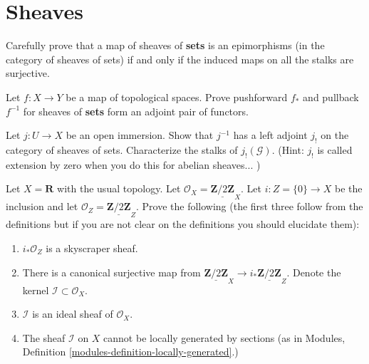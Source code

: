 \section{Sheaves}
\label{section-sheaves}

\begin{exercise}
\label{exercise-epi-sheaves-sets}
Carefully prove that a map of sheaves of {\bf sets}
is an epimorphisms (in the category of sheaves of sets) if and only if the
induced maps on all the stalks are surjective.
\end{exercise}

\begin{exercise}
\label{exercise-adjoint-push-pull}
Let $f : X \to Y$ be a map of topological spaces.
Prove pushforward $f_\ast$ and pullback $f^{-1}$ for sheaves of {\bf sets}
form an adjoint pair of functors.
\end{exercise}

\begin{exercise}
\label{exercise-j-shriek}
Let $j : U \to X$ be an open immersion. Show
that $j^{-1}$ has a left adjoint $j_{!}$ on the category of sheaves
of sets. Characterize the stalks of $j_{!}({\mathcal G})$. (Hint: $j_{!}$
is called extension by zero when you do this for abelian sheaves... )
\end{exercise}

\begin{exercise}
\label{exercise-not-locally-generated-by-sections}
Let $X = \mathbf{R}$ with the usual topology.
Let $\mathcal{O}_X = \underline{\mathbf{Z}/2\mathbf{Z}}_X$.
Let $i : Z = \{0\} \to X$ be the inclusion and let
$\mathcal{O}_Z = \underline{\mathbf{Z}/2\mathbf{Z}}_Z$.
Prove the following (the first three follow from the definitions but if you
are not clear on the definitions you should elucidate them):
\begin{enumerate}
\item $i_*\mathcal{O}_Z$ is a skyscraper sheaf.
\item There is a canonical surjective map from
$\underline{\mathbf{Z}/2\mathbf{Z}}_X \to
i_*\underline{\mathbf{Z}/2\mathbf{Z}}_Z$.
Denote the kernel $\mathcal{I} \subset \mathcal{O}_X$.
\item $\mathcal{I}$ is an ideal sheaf of $\mathcal{O}_X$.
\item The sheaf $\mathcal{I}$ on $X$ cannot be locally generated
by sections (as in
Modules, Definition \ref{modules-definition-locally-generated}.)
\end{enumerate}
\end{exercise}

